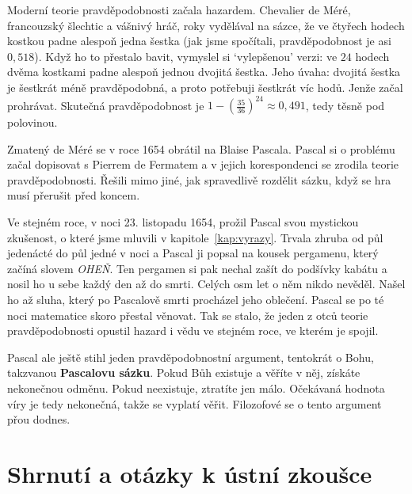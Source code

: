 Moderní teorie pravděpodobnosti začala hazardem. Chevalier de Méré, francouzský šlechtic a vášnivý hráč, roky vydělával na sázce, že ve čtyřech hodech kostkou padne alespoň jedna šestka (jak jsme spočítali, pravděpodobnost je asi $0{,}518$). Když ho to přestalo bavit, vymyslel si `vylepšenou' verzi: ve $24$ hodech dvěma kostkami padne alespoň jednou dvojitá šestka. Jeho úvaha: dvojitá šestka je šestkrát méně pravděpodobná, a proto potřebuji šestkrát víc hodů. Jenže začal prohrávat. Skutečná pravděpodobnost je $1 - {\left(\frac{35}{36}\right)}^{24}\approx 0{,}491$, tedy těsně pod polovinou.

Zmatený de Méré se v roce 1654 obrátil na Blaise Pascala. Pascal si o problému začal dopisovat s Pierrem de Fermatem a v jejich korespondenci se zrodila teorie pravděpodobnosti. Řešili mimo jiné, jak spravedlivě rozdělit sázku, když se hra musí přerušit před koncem.

Ve stejném roce, v noci 23. listopadu 1654, prožil Pascal svou mystickou zkušenost, o které jsme mluvili v kapitole~\ref{kap:vyrazy}. Trvala zhruba od půl jedenácté do půl jedné v noci a Pascal ji popsal na kousek pergamenu, který začíná slovem \textit{OHEŇ}. Ten pergamen si pak nechal zašít do podšívky kabátu a nosil ho u sebe každý den až do smrti. Celých osm let o něm nikdo nevěděl. Našel ho až sluha, který po Pascalově smrti procházel jeho oblečení. Pascal se po té noci matematice skoro přestal věnovat. Tak se stalo, že jeden z otců teorie pravděpodobnosti opustil hazard i vědu ve stejném roce, ve kterém je spojil.

Pascal ale ještě stihl jeden pravděpodobnostní argument, tentokrát o Bohu, takzvanou \textbf{Pascalovu sázku}. Pokud Bůh existuje a věříte v něj, získáte nekonečnou odměnu. Pokud neexistuje, ztratíte jen málo. Očekávaná hodnota víry je tedy nekonečná, takže se vyplatí věřit. Filozofové se o tento argument přou dodnes.

\section{Shrnutí a otázky k ústní zkoušce}

